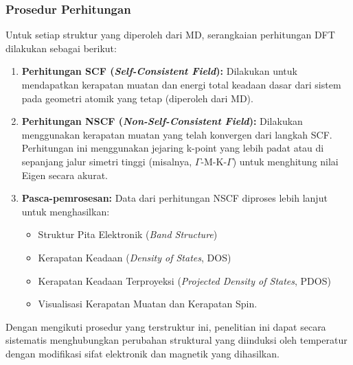 \subsubsection{Prosedur Perhitungan}
Untuk setiap struktur yang diperoleh dari MD, serangkaian perhitungan DFT dilakukan sebagai berikut:
\begin{enumerate}
    \item \textbf{Perhitungan SCF (\textit{Self-Consistent Field}):} Dilakukan untuk mendapatkan kerapatan muatan dan energi total keadaan dasar dari sistem pada geometri atomik yang tetap (diperoleh dari MD).
\item \textbf{Perhitungan NSCF (\textit{Non-Self-Consistent Field}):} Dilakukan menggunakan kerapatan muatan yang telah konvergen dari langkah SCF.
Perhitungan ini menggunakan jejaring k-point yang lebih padat atau di sepanjang jalur simetri tinggi (misalnya, $\Gamma$-M-K-$\Gamma$) untuk menghitung nilai Eigen secara akurat.
\item \textbf{Pasca-pemrosesan:} Data dari perhitungan NSCF diproses lebih lanjut untuk menghasilkan:
    \begin{itemize}
        \item Struktur Pita Elektronik (\textit{Band Structure})
        \item Kerapatan Keadaan (\textit{Density of States}, DOS)
        \item Kerapatan Keadaan Terproyeksi (\textit{Projected Density of States}, PDOS)
        \item Visualisasi Kerapatan Muatan dan Kerapatan Spin.
\end{itemize}
\end{enumerate}
Dengan mengikuti prosedur yang terstruktur ini, penelitian ini dapat secara sistematis menghubungkan perubahan struktural yang diinduksi oleh temperatur dengan modifikasi sifat elektronik dan magnetik yang dihasilkan.